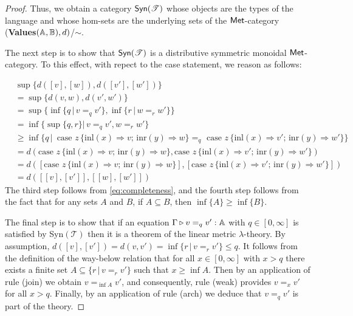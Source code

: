 \begin{proof}
  Thus, we obtain a category $\mathsf{Syn}(\mathscr{T})$ whose objects are the types of the language and whose hom-sets are the underlying sets of the  $\mathsf{Met}$-category (\textbf{Values}$(\mathbb{A},\mathbb{B}),d)$/$\sim$.


  The next step is to show that $\mathsf{Syn}(\mathscr{T})$ is a distributive symmetric monoidal $\mathsf{Met}$-category. To this effect, with repect to the case statement, we reason as follows:

  \begin{align*}
    & \sup{\{d([v],[w]),d([v'],[w']) \}}  \\
    & = \sup{\{d(v,w),d(v',w') \}} \\
    & = \sup {\{ \inf{\{q \, \vert \, v=_q v'\}},\inf{\{r \, \vert \, w=_r w'\}}  \}} \\
    & = \inf{\{ \sup \{ q, r \} \vert \, v=_q v', w=_r w' \}} &  \\
    & \geq  \inf{ \{ q  \,\vert \, \text{ case } z \,   \{\text{inl} (x) \Rightarrow v ; \, \text{inr} (y) \Rightarrow w\} =_{q} \text{ case } z \,  \{\text{inl} (x) \Rightarrow v' ; \,\text{inr} (y) \Rightarrow w'\} \} } &  \\ 
    & = d(\text{case } z \,   \{\text{inl} (x) \Rightarrow v ; \, \text{inr} (y) \Rightarrow w\}, \text{case } z \,  \{\text{inl} (x) \Rightarrow v' ; \,\text{inr} (y) \Rightarrow w'\}) \\
    & = d([\text{case } z \,   \{\text{inl} (x) \Rightarrow v ; \, \text{inr} (y) \Rightarrow w\}], [\text{case } z \,  \{\text{inl} (x) \Rightarrow v' ; \,\text{inr} (y) \Rightarrow w'\}]) \\
    & = d([[v],[v']],[[w],[w']])  
  \end{align*}
   The third step follows from \autoref{eq:completeness}, and the fourth step follows from the fact that for any sets $A$ and $B$, if $A \subseteq B$, then $\inf\{A\} \geq \inf\{B\}$.

  The final step is to show that if an equation $\Gamma \triangleright v =_q v' : \mathbb{A}$ with $q \in [0, \infty]$ is satisfied by Syn$(\mathscr{T})$ then it is a theorem of the linear metric $\lambda$-theory. By assumption, $d([v],[v']) = d(v,v') =  \inf{ \{r \, \vert \, v =_r v'\}} \leq q$. It follows from the definition of the way-below relation that for all
 $x \in [0, \infty]$ with $x>q$ there exists a finite set $A \subseteq \{r \, \vert \, v =_r v'\}$ such that $x \geq \inf{A}$. Then by an
 application of rule (join) we obtain $v =_{\inf{A}} v'$, and consequently, rule (weak) provides $v =_x v'$ for all $x > q$. Finally, by an application of rule (arch)  we deduce that $v =_q v'$ is part of the theory.
\end{proof}

